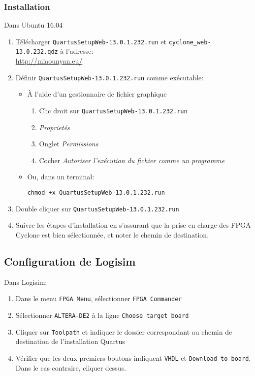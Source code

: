\subsubsection{Installation}
\noindent Dans Ubuntu 16.04
\begin{enumerate}
	\item Télécharger \texttt{QuartusSetupWeb-13.0.1.232.run} et \texttt{cyclone\_web-13.0.232.qdz} à l'adresse: \\
	\url{http://miaounyan.eu/}
	\item Définir \texttt{QuartusSetupWeb-13.0.1.232.run} comme exécutable:
		\begin{itemize}
			\item À l'aide d'un gestionnaire de fichier graphique
			\begin{enumerate}
				\item Clic droit sur \texttt{QuartusSetupWeb-13.0.1.232.run}
				\item \textit{Proprietés}
				\item Onglet \textit{Permissions}
				\item Cocher \textit{Autoriser l'exécution du fichier comme un programme}
			\end{enumerate}
\vspace{0.2em}
			\item Ou, dans un terminal:
			\begin{lstlisting}
chmod +x QuartusSetupWeb-13.0.1.232.run
			\end{lstlisting}
		\end{itemize}
	\item Double cliquer sur \texttt{QuartusSetupWeb-13.0.1.232.run}
	\item Suivre les étapes d'installation en s'assurant que la prise en charge des FPGA Cyclone est bien sélectionnée, et noter le chemin de destination.
\end{enumerate}

\subsection{Configuration de Logisim}
\noindent Dans Logisim:
\begin{enumerate}
	\item Dans le menu \texttt{FPGA Menu}, sélectionner \texttt{FPGA Commander}
	\item Sélectionner \texttt{ALTERA-DE2} à la ligne \texttt{Choose target board}
	\item Cliquer sur \texttt{Toolpath} et indiquer le dossier correspondant au chemin de destination de l'installation Quartus
	\item Vérifier que les deux premiers boutons indiquent \texttt{VHDL} et \texttt{Download to board}. Dans le cas contraire, cliquer dessus.
\end{enumerate}

